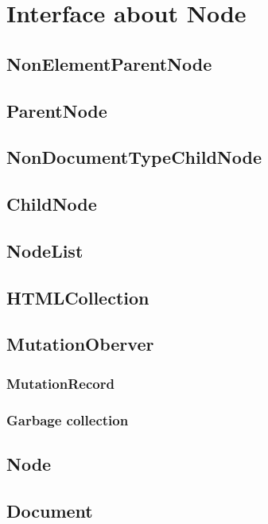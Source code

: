 \chapter{Interface about Node}

\section{NonElementParentNode}

\section{ParentNode}

\section{NonDocumentTypeChildNode}

\section{ChildNode}

\section{NodeList}

\section{HTMLCollection}

\section{MutationOberver}

\subsection{MutationRecord}

\subsection{Garbage collection}

\section{Node}

\section{Document}

